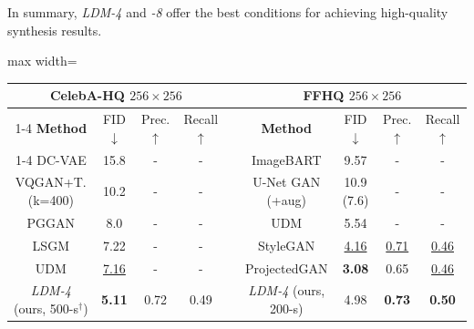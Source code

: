 In summary, \emph{LDM-4} and \emph{-8} offer the best conditions for achieving high-quality synthesis results.

\begin{table}[t]
\begin{footnotesize}
  \begin{adjustbox}{max width=\linewidth}
  \begin{tabular}{ccccccccc}
    \toprule
    \multicolumn{4}{c}{CelebA-HQ $256\times 256$} & & \multicolumn{4}{c}{FFHQ $256\times 256$} \\
    \cmidrule{1-4} \cmidrule{6-9}
    \textbf{Method} & FID $\downarrow$ & Prec. $\uparrow$ & Recall $\uparrow$ & & \textbf{Method} & FID $\downarrow$ & Prec. $\uparrow$ & Recall $\uparrow$  \\
    \cmidrule{1-4} \cmidrule{6-9}
     DC-VAE \cite{DBLP:conf/cvpr/ParmarLLT21} & 15.8 & -&- & & ImageBART \cite{DBLP:journals/corr/abs-2108-08827}  & 9.57 & - & - \\
    VQGAN+T. \cite{DBLP:journals/corr/abs-2012-09841} (k=400) & 10.2 & - & -& & U-Net GAN (+aug) \cite{DBLP:conf/cvpr/SchonfeldSK20} & 10.9 (7.6) & - & - \\
    PGGAN \cite{DBLP:journals/corr/abs-1710-10196} & 8.0 &- &- & & UDM \cite{DBLP:journals/corr/abs-2106-05527}  & 5.54 & - & - \\
    LSGM \cite{DBLP:journals/corr/abs-2106-05931} & 7.22 & -&- & & StyleGAN \cite{stylegan} & \underline{4.16} & \underline{0.71} & \underline{0.46} \\
     UDM \cite{DBLP:journals/corr/abs-2106-05527} & \underline{7.16} & -&- & & ProjectedGAN\cite{DBLP:journals/corr/abs-2111-01007} & \textbf{3.08} & 0.65 & \underline{0.46} \\
    \midrule
    \emph{LDM-4} (ours, 500-s$^\dagger$) & \textbf{5.11} & 0.72 & 0.49 & &  \emph{LDM-4} (ours, 200-s) & 4.98 & \textbf{0.73} & \textbf{0.50} \\
\bottomrule
    \end{tabular}
    \end{adjustbox}


\end{footnotesize}
\end{table}
